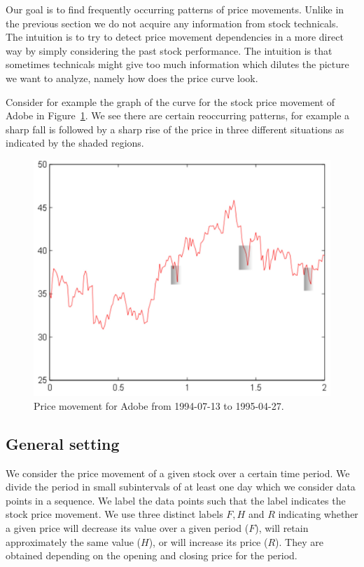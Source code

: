 \documentclass[10pt]{article}
\begin{document}
Our goal is to find frequently occurring patterns of price movements. Unlike in
the previous section we do not acquire any information from stock technicals.
The intuition is to try to detect price movement dependencies in a more direct
way by simply considering the past stock performance. The intuition is that
sometimes technicals might give too much information which dilutes the picture
we want to analyze, namely how does the price curve look.

Consider for example the graph of the curve for the stock price movement of
Adobe in Figure~\ref{fig:adbe}. We see there are certain reoccurring patterns,
for example a sharp fall is followed by a sharp rise of the price in three
different situations as indicated by the shaded regions. 

\begin{figure}[t]
\centering%
\includegraphics[scale=0.3]{ADBE_new.pdf}
\caption{Price movement for Adobe from 1994-07-13 to 1995-04-27.}
\label{fig:adbe}
\end{figure}

\subsection{General setting}
We consider the price movement of a given stock over a certain time period. We
divide the period in small subintervals of at least one day which we consider
data points in a sequence.  We label the data points such that the label
indicates the stock price movement. We use three distinct labels $F, H$ and $R$
indicating whether a given price will decrease its value over a given period
($F$), will retain approximately the same value ($H$), or will increase its
price ($R$). They are obtained depending on the opening and closing price for
the period. 
\end{document}
